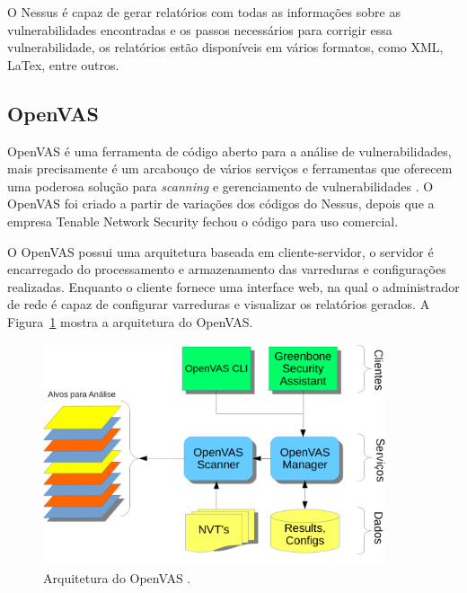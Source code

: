 O Nessus é capaz de gerar relatórios com todas as informações sobre as vulnerabilidades encontradas e os passos necessários para corrigir essa vulnerabilidade, os relatórios estão disponíveis em vários formatos, como \gls{XML}, LaTex, entre outros.







\subsection{OpenVAS}
\gls{OpenVAS} é uma ferramenta de código aberto para a análise de vulnerabilidades, mais precisamente é um arcabouço de vários serviços e ferramentas que oferecem uma poderosa solução para \textit{scanning} e gerenciamento de vulnerabilidades \cite{openvas}.
O \gls{OpenVAS} foi criado a partir de  variações  dos códigos do Nessus, depois que a empresa Tenable Network Security fechou o código para uso comercial.

O \gls{OpenVAS} possui uma arquitetura baseada em cliente-servidor, o servidor é encarregado do processamento e armazenamento das varreduras e configurações realizadas. Enquanto o cliente fornece uma interface web, na qual o administrador de rede é capaz de configurar varreduras e visualizar os relatórios gerados. A Figura~\ref{fig:arquitetura:openvas} mostra a arquitetura do \gls{OpenVAS}.
\begin{figure}[H]
    \centering
    \includegraphics[width=0.90\textwidth]{figuras/Openvas Arquitetura.png}
    \caption{Arquitetura do \gls{OpenVAS} \cite{openvas}.}
    \label{fig:arquitetura:openvas}
\end{figure}

